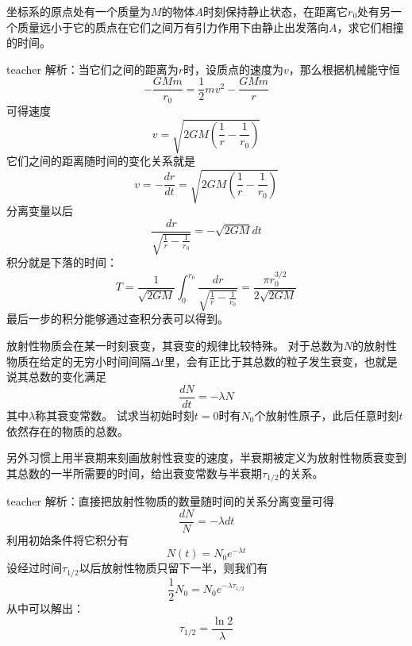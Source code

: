 \begin{example}
坐标系的原点处有一个质量为$M$的物体$A$时刻保持静止状态，在距离它$r_0$处有另一个质量远小于它的质点在它们之间万有引力作用下由静止出发落向$A$，求它们相撞的时间。
\begin{taggedblock}{teacher}
\newline
解析：当它们之间的距离为$r$时，设质点的速度为$v$，那么根据机械能守恒
\[
-\frac{GMm}{r_0}=\frac{1}{2}mv^2-\frac{GMm}{r}
\]
可得速度
\[
v = \sqrt{2GM(\frac{1}{r}-\frac{1}{r_0})}
\]
它们之间的距离随时间的变化关系就是
\[
v=-\frac{dr}{dt} = \sqrt{2GM(\frac{1}{r}-\frac{1}{r_0})}
\]
分离变量以后
\[
\frac{dr}{\sqrt{\frac{1}{r}-\frac{1}{r_0}}}=-\sqrt{2GM}dt
\]
积分就是下落的时间：
\[
T = \frac{1}{\sqrt{2GM}}\int_0^{r_0}\frac{dr}{\sqrt{\frac{1}{r}-\frac{1}{r_0}}} = \frac{\pi r_0^{3/2}}{2\sqrt{2GM}}
\]
最后一步的积分能够通过查积分表可以得到。
\end{taggedblock}
\end{example}

\begin{example}
放射性物质会在某一时刻衰变，其衰变的规律比较特殊。
对于总数为$N$的放射性物质在给定的无穷小时间间隔$\Delta t$里，会有正比于其总数的粒子发生衰变，也就是说其总数的变化满足
\[
\frac{dN}{dt}=-\lambda N
\]
其中$\lambda$称其衰变常数。
试求当初始时刻$t=0$时有$N_0$个放射性原子，此后任意时刻$t$依然存在的物质的总数。

另外习惯上用半衰期来刻画放射性衰变的速度，半衰期被定义为放射性物质衰变到其总数的一半所需要的时间，给出衰变常数与半衰期$\tau_{1/2}$的关系。
\begin{taggedblock}{teacher}
\newline
解析：直接把放射性物质的数量随时间的关系分离变量可得
\[\frac{dN}{N}=-\lambda dt\]
利用初始条件将它积分有
\[N(t)=N_0e^{-\lambda t}\]
设经过时间$\tau_{1/2}$以后放射性物质只留下一半，则我们有
\[
\frac{1}{2}N_0 = N_0e^{-\lambda \tau_{1/2}}
\]
从中可以解出：
\[
\tau_{1/2}=\frac{\ln 2}{\lambda}
\]
\end{taggedblock}
\end{example}



